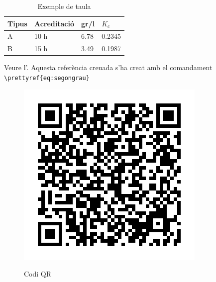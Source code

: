 \documentclass[fontsize=11pt,%
               paper=a4,%
               captions=tableheading,%
               numbers=noenddot,%
               parskip=full,%
               ]{scrartcl}
\begin{document}
 \begin{table}[ht]
  \centering
  \begin{tabular}{llll}
    \toprule
    Tipus & Acreditació & gr/l & $K_c$ \\
    \midrule
    A & 10 h & 6.78 & 0.2345 \\
    B & 15 h & 3.49 & 0.1987 \\
    \bottomrule
  \end{tabular}
  \caption{Exemple de taula}
  \label{tau:durada}
\end{table}


Veure l'. Aquesta referència creuada s'ha creat amb el comandament \verb+\prettyref{eq:segongrau}+

\lipsum[2-3]

\begin{figure}[h]
 \centering
 \includegraphics[scale=0.5,keepaspectratio=true]{./qrplanet.png}
 \label{fig:qrcode}
 \caption{Codi QR}
\end{figure}
\end{document}
